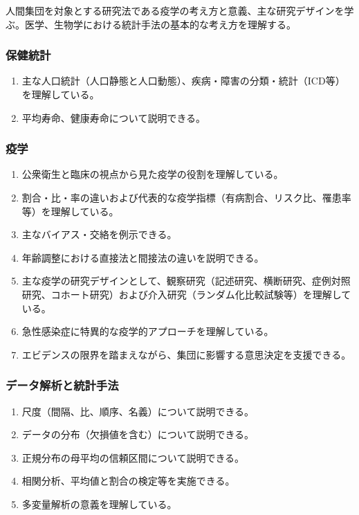 \documentclass[
]{ltjsarticle}
\providecommand{\tightlist}{%
  \setlength{\itemsep}{0pt}\setlength{\parskip}{0pt}}
\begin{document}
人間集団を対象とする研究法である疫学の考え方と意義、主な研究デザインを学ぶ。医学、生物学における統計手法の基本的な考え方を理解する。

\hypertarget{ux4fddux5065ux7d71ux8a08}{%
\subsubsection{保健統計}\label{ux4fddux5065ux7d71ux8a08}}

\begin{enumerate}
\def\labelenumi{\arabic{enumi}.}
\tightlist
\item
  主な人口統計（人口静態と人口動態）、疾病・障害の分類・統計（ICD等）を理解している。
\item
  平均寿命、健康寿命について説明できる。
\end{enumerate}

\hypertarget{ux75abux5b66}{%
\subsubsection{疫学}\label{ux75abux5b66}}

\begin{enumerate}
\def\labelenumi{\arabic{enumi}.}
\tightlist
\item
  公衆衛生と臨床の視点から見た疫学の役割を理解している。
\item
  割合・比・率の違いおよび代表的な疫学指標（有病割合、リスク比、罹患率等）を理解している。
\item
  主なバイアス・交絡を例示できる。
\item
  年齢調整における直接法と間接法の違いを説明できる。
\item
  主な疫学の研究デザインとして、観察研究（記述研究、横断研究、症例対照研究、コホート研究）および介入研究（ランダム化比較試験等）を理解している。
\item
  急性感染症に特異的な疫学的アプローチを理解している。
\item
  エビデンスの限界を踏まえながら、集団に影響する意思決定を支援できる。
\end{enumerate}

\hypertarget{ux30c7ux30fcux30bfux89e3ux6790ux3068ux7d71ux8a08ux624bux6cd5}{%
\subsubsection{データ解析と統計手法}\label{ux30c7ux30fcux30bfux89e3ux6790ux3068ux7d71ux8a08ux624bux6cd5}}

\begin{enumerate}
\def\labelenumi{\arabic{enumi}.}
\tightlist
\item
  尺度（間隔、比、順序、名義）について説明できる。
\item
  データの分布（欠損値を含む）について説明できる。
\item
  正規分布の母平均の信頼区間について説明できる。
\item
  相関分析、平均値と割合の検定等を実施できる。
\item
  多変量解析の意義を理解している。
\end{enumerate}
\end{document}
